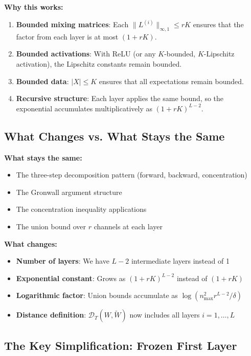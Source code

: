 \textbf{Why this works:}
\begin{enumerate}
\item \textbf{Bounded mixing matrices}: Each $\|L^{(i)}\|_{\infty,1} \le rK$ ensures that the factor from each layer is at most $(1+rK)$.
\item \textbf{Bounded activations}: With ReLU (or any $K$-bounded, $K$-Lipschitz activation), the Lipschitz constants remain bounded.
\item \textbf{Bounded data}: $|X| \le K$ ensures that all expectations remain bounded.
\item \textbf{Recursive structure}: Each layer applies the same bound, so the exponential accumulates multiplicatively as $(1+rK)^{L-2}$.
\end{enumerate}

\subsection{What Changes vs. What Stays the Same}

\textbf{What stays the same:}
\begin{itemize}
\item The three-step decomposition pattern (forward, backward, concentration)
\item The Gronwall argument structure
\item The concentration inequality applications
\item The union bound over $r$ channels at each layer
\end{itemize}

\textbf{What changes:}
\begin{itemize}
\item \textbf{Number of layers}: We have $L-2$ intermediate layers instead of 1
\item \textbf{Exponential constant}: Grows as $(1+rK)^{L-2}$ instead of $(1+rK)$
\item \textbf{Logarithmic factor}: Union bounds accumulate as $\log(n_{\max}^2r^{L-2}/\delta)$
\item \textbf{Distance definition}: $\mathscr{D}_T(W, \tilde{W})$ now includes all layers $i = 1, \ldots, L$
\end{itemize}

\subsection{The Key Simplification: Frozen First Layer}

